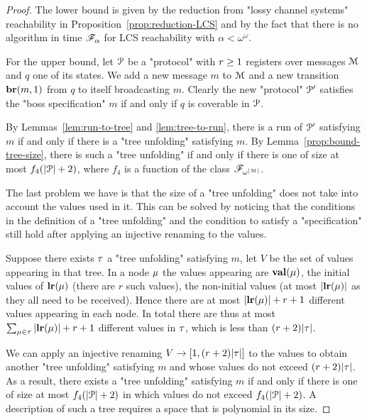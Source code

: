 \ifproofs
\begin{proof}
	The lower bound is given by the reduction from "lossy channel systems" reachability in Proposition~\ref{prop:reduction-LCS} and by the fact that there is no algorithm in time $\mathscr{F}_{\alpha}$ for LCS reachability with $\alpha < \omega^\omega$.
	
	For the upper bound, let $\mathcal{P}$ be a "protocol" with $r \geq 1$ registers over messages $\mathcal{M}$ and $q$ one of its states. We add a new message $m$ to $\mathcal{M}$ and a new transition $\textbf{br}(m, 1)$ from $q$ to itself broadcasting $m$. 
	Clearly the new "protocol" $\mathcal{P}'$ satisfies the "boss specification" $m$ if and only if $q$ is coverable in $\mathcal{P}$.
	
	By Lemmas~\ref{lem:run-to-tree} and \ref{lem:tree-to-run}, there is a run of $\mathcal{P}'$ satisfying $m$ if and only if there is a "tree unfolding" satisfying $m$.
	By Lemma~\ref{prop:bound-tree-size}, there is such a "tree unfolding" if and only if there is one of size at most $f_4(|\mathcal{P}|+2)$, where $f_4$ is a function of the class $\mathscr{F}_{\omega^{|\mathcal{M}|}}$.
	
	The last problem we have is that the size of a "tree unfolding" does not take into account the values used in it. This can be solved by noticing that the conditions in the definition of a "tree unfolding" and the condition to satisfy a "specification" still hold after applying an injective renaming to the values. 
	
	Suppose there exists $\tau$ a "tree unfolding" satisfying $m$, let $V$ be the set of values appearing in that tree. In a node $\mu$ the values appearing are $\mathbf{val}(\mu)$, the initial values of $\mathbf{lr}(\mu)$ (there are $r$ such values), the non-initial values (at most $|\mathbf{lr}(\mu)|$ as they all need to be received).
	Hence there are at most $|\mathbf{lr}(\mu)| + r +1$ different values appearing in each node.
	In total there are thus at most $\sum_{\mu \in \tau} |\mathbf{lr}(\mu)| + r +1$ different values in $\tau$, which is less than $(r+2)|\tau|$.
	
	We can apply an injective renaming $V \to [1,(r+2)|\tau|]$ to the values to obtain another "tree unfolding" satisfying $m$ and whose values do not exceed $(r+2)|\tau|$.
	As a result, there exists a "tree unfolding" satisfying $m$ if and only if there is one of size at most $f_4(|\mathcal{P}|+2)$ in which values do not exceed $f_4(|\mathcal{P}|+2)$. A description of such a tree requires a space that is polynomial in its size.
	

\end{proof}
